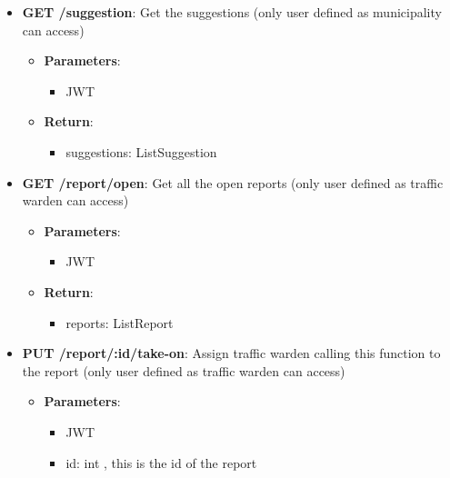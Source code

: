 \documentclass{article}
\begin{document}
\begin{itemize}
\begin{itemize}
\begin{itemize}
\begin{itemize}
						\end{itemize}
					\item \textbf{Return}:
						\begin{itemize}
							\item ranking: List\textlangle{}String\textrangle{} , ordered list of license plate
						\end{itemize}
				\end{itemize}
			\item \textbf{GET /suggestion}:
				Get the suggestions (only user defined as municipality can access)
				\begin{itemize}
					\item \textbf{Parameters}:
						\begin{itemize}
							\item JWT
						\end{itemize}
					\item \textbf{Return}:
						\begin{itemize}
							\item suggestions: List\textlangle{}Suggestion\textrangle{}
						\end{itemize}
				\end{itemize}
			\item \textbf{GET /report/open}:
				Get all the open reports (only user defined as traffic warden can access)
				\begin{itemize}
					\item \textbf{Parameters}:
						\begin{itemize}
							\item JWT
						\end{itemize}
					\item \textbf{Return}:
						\begin{itemize}
							\item reports: List\textlangle{}Report\textrangle{}
						\end{itemize}
				\end{itemize}
			\item \textbf{PUT /report/:id/take-on}:
				Assign traffic warden calling this function to the report (only user defined as traffic warden can access)
				\begin{itemize}
					\item \textbf{Parameters}:
						\begin{itemize}
							\item JWT
							\item id: int , this is the id of the report

\end{itemize}
\end{itemize}
\end{itemize}
\end{itemize}
\end{document}
